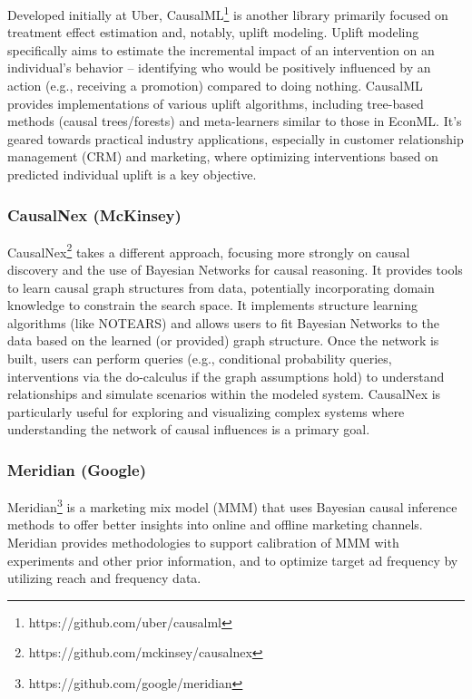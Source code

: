 {{Developed initially at Uber, CausalML\footnote{https://github.com/uber/causalml} \cite{zhao2023causal} is another library primarily focused on treatment effect estimation and, notably, uplift modeling. Uplift modeling specifically aims to estimate the incremental impact of an intervention on an individual's behavior – identifying who would be positively influenced by an action (e.g., receiving a promotion) compared to doing nothing. CausalML provides implementations of various uplift algorithms, including tree-based methods (causal trees/forests) and meta-learners similar to those in EconML. It's geared towards practical industry applications, especially in customer relationship management (CRM) and marketing, where optimizing interventions based on predicted individual uplift is a key objective.

\subsubsection{CausalNex (McKinsey)}

CausalNex\footnote{https://github.com/mckinsey/causalnex} takes a different approach, focusing more strongly on causal discovery and the use of Bayesian Networks for causal reasoning. It provides tools to learn causal graph structures from data, potentially incorporating domain knowledge to constrain the search space. It implements structure learning algorithms (like NOTEARS) and allows users to fit Bayesian Networks to the data based on the learned (or provided) graph structure. Once the network is built, users can perform queries (e.g., conditional probability queries, interventions via the do-calculus if the graph assumptions hold) to understand relationships and simulate scenarios within the modeled system. CausalNex is particularly useful for exploring and visualizing complex systems where understanding the network of causal influences is a primary goal.


\subsubsection{Meridian (Google)}

Meridian\footnote{https://github.com/google/meridian} is a marketing mix model (MMM) that uses Bayesian causal inference methods to offer better insights into online and offline marketing channels. Meridian provides methodologies to support calibration of MMM with experiments and other prior information, and to optimize target ad frequency by utilizing reach and frequency data.

}}
